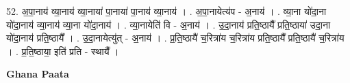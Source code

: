 \documentclass[17pt]{extarticle}
\begin{document}
52. अ॒पा॒नाय॑ व्या॒नाय॑ व्या॒नाया॑ पा॒नाया॑ पा॒नाय॑ व्या॒नाय॑ । . अ॒पा॒नायेत्य॑प - अ॒नाय॑ । . व्या॒ना यो॑दा॒ना यो॑दा॒नाय॑ व्या॒नाय॑ व्या॒ना यो॑दा॒नाय॑ । . व्या॒नायेति॑ वि - अ॒नाय॑ । . उ॒दा॒नाय॑ प्रति॒ष्ठायै᳚ प्रति॒ष्ठाया॑ उदा॒ना यो॑दा॒नाय॑ प्रति॒ष्ठायै᳚ । . उ॒दा॒नायेत्यु॑त् - अ॒नाय॑ । . प्र॒ति॒ष्ठायै॑ च॒रित्रा॑य च॒रित्रा॑य प्रति॒ष्ठायै᳚ प्रति॒ष्ठायै॑ च॒रित्रा॑य । . प्र॒ति॒ष्ठाया॒ इति॑ प्रति - स्थायै᳚ । \newline

\textbf{Ghana Paata } \newline
\end{document}

